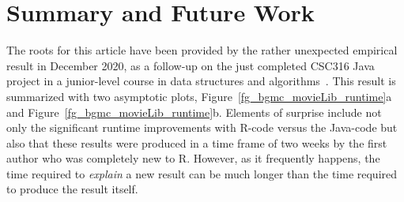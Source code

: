 \vspace*{2ex}
\section{Summary and Future Work}  \label{sec_summary}
\noindent
The roots for this article have been  provided by the rather unexpected 
empirical result in December 2020, as a follow-up on the just completed 
CSC316 Java project in a junior-level course in data
structures and algorithms~\cite{OPUS-csc316-fall-2020}.
This result is summarized with two asymptotic plots, 
Figure~\ref{fg_bgmc_movieLib_runtime}a and Figure~\ref{fg_bgmc_movieLib_runtime}b.
Elements of surprise include not only the significant runtime improvements
with R-code versus the Java-code but also that these results were produced in a time frame of two weeks by the first author who was completely new to R.
However, as it frequently happens, the time required to {\it explain} a new result can be much longer than the time required 
to produce the result itself.

